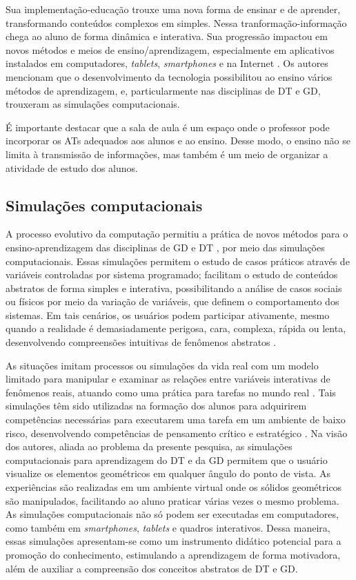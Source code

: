 Sua implementação-educação trouxe uma nova forma de ensinar e de
aprender, transformando conteúdos complexos em simples. Nessa
tranformação-informação chega ao aluno de forma dinâmica e interativa.
Sua progressão impactou em novos métodos e meios de ensino/aprendizagem,
especialmente em aplicativos instalados em computadores, \textit{tablets},
\textit{smartphones} e na Internet \cite{siahaan2017}. Os autores mencionam
que o desenvolvimento da tecnologia possibilitou ao ensino vários
métodos de aprendizagem, e, particularmente nas disciplinas de DT e GD,
trouxeram as simulações computacionais.

É importante destacar que a sala de aula é um espaço onde o professor
pode incorporar os ATs adequados aos alunos e ao ensino. Desse modo, o
ensino não se limita à transmissão de informações, mas também é um meio
de organizar a atividade de estudo dos alunos.

\subsection{Simulações computacionais}\label{sub-sec-simulaçõescomputacionais}

A processo evolutivo da computação permitiu a prática de novos métodos
para o ensino-aprendizagem das disciplinas de GD e DT \cite{mexas2015}, por meio das simulações computacionais. Essas simulações permitem
o estudo de casos práticos através de variáveis controladas por sistema
programado; facilitam o estudo de conteúdos abstratos de forma simples e
interativa, possibilitando a análise de casos sociais ou físicos por
meio da variação de variáveis, que definem o comportamento dos sistemas.
Em tais cenários, os usuários podem participar ativamente, mesmo quando
a realidade é demasiadamente perigosa, cara, complexa, rápida ou lenta,
desenvolvendo compreensões intuitivas de fenômenos abstratos \cite{garneli2018}.

As situações imitam processos ou simulações da vida real com um modelo
limitado para manipular e examinar as relações entre variáveis
interativas de fenômenos reais, atuando como uma prática para tarefas no
mundo real \cite{kunkler2006,lamb2018}. Tais simulações têm sido
utilizadas na formação dos alunos para adquirirem competências
necessárias para executarem uma tarefa em um ambiente de baixo risco,
desenvolvendo competências de pensamento crítico e estratégico \cite{kappers2016}. Na visão dos autores, aliada ao problema da presente
pesquisa, as simulações computacionais para aprendizagem do DT e da GD
permitem que o usuário visualize os elementos geométricos em qualquer
ângulo do ponto de vista. As experiências são realizadas em um ambiente
virtual onde os sólidos geométricos são manipulados, facilitando ao
aluno praticar várias vezes o mesmo problema. As simulações
computacionais não só podem ser executadas em computadores, como também
em \textit{smartphones}, \textit{tablets} e quadros interativos. Dessa maneira, essas simulações apresentam-se como um instrumento didático potencial para a promoção do conhecimento, estimulando a aprendizagem de forma
motivadora, além de auxiliar a compreensão dos conceitos abstratos de DT
e GD.

